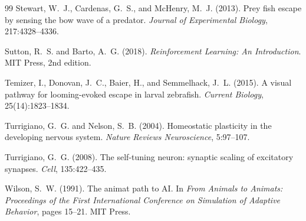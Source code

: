\documentclass[12pt]{article}
\begin{document}
\begin{thebibliography}{99}
Stewart, W.~J., Cardenas, G.~S., and McHenry, M.~J. (2013).
Prey fish escape by sensing the bow wave of a predator.
\textit{Journal of Experimental Biology}, 217:4328--4336.

Sutton, R.~S. and Barto, A.~G. (2018).
\textit{Reinforcement Learning: An Introduction}.
MIT Press, 2nd edition.

Temizer, I., Donovan, J.~C., Baier, H., and Semmelhack, J.~L. (2015).
A visual pathway for looming-evoked escape in larval zebrafish.
\textit{Current Biology}, 25(14):1823--1834.

Turrigiano, G.~G. and Nelson, S.~B. (2004).
Homeostatic plasticity in the developing nervous system.
\textit{Nature Reviews Neuroscience}, 5:97--107.

Turrigiano, G.~G. (2008).
The self-tuning neuron: synaptic scaling of excitatory synapses.
\textit{Cell}, 135:422--435.

Wilson, S.~W. (1991).
The animat path to {AI}.
In \textit{From Animals to Animats: Proceedings of the First International Conference on Simulation of Adaptive Behavior}, pages 15--21. MIT Press.

\end{thebibliography}
\endgroup
\end{document}
